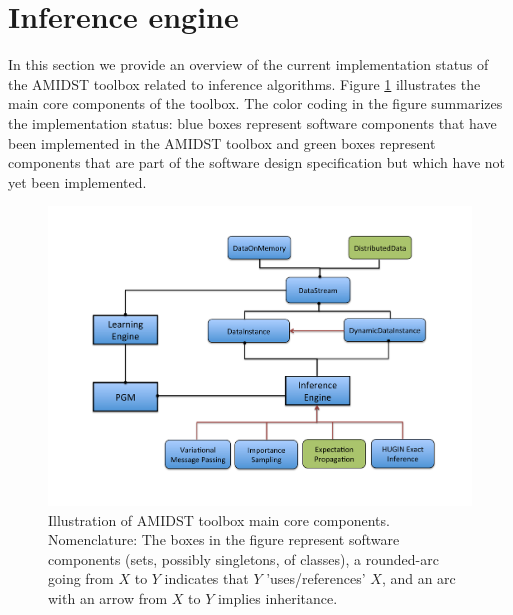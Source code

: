 \section{Inference engine} \label{sec:InferenceEngine}

In this section we provide an overview of the current implementation status of the AMIDST toolbox related to inference algorithms. Figure \ref{Figure:InferenceEngine} illustrates the main core components of the toolbox. The color coding in the figure summarizes the implementation status: blue boxes represent software components that have been implemented in the AMIDST toolbox and green boxes represent components that are part of the software design specification but which have not yet been implemented.

\begin{figure}[ht!]
\begin{center}
\includegraphics[width=\linewidth]{./figures/InferenceEngine}
\vspace{-0.5in}
\caption{\label{Figure:InferenceEngine} Illustration of AMIDST toolbox main core components. Nomenclature: The boxes in the
      figure represent software components (sets, possibly singletons, of classes), a rounded-arc going from $X$ to $Y$ indicates that $Y$ 'uses/references' $X$, and an arc with an arrow from $X$ to $Y$ implies inheritance.}
\end{center}
\end{figure}

